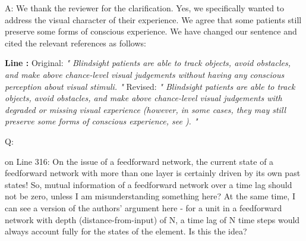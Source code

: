 \documentclass[utf8]{article}
\newcounter{cQuestion}[section]
\newenvironment{question}
    {\refstepcounter{cQuestion}\color{Blue}\noindent\newline Q\thecQuestion:}
    {~\newline}
\newenvironment{ans}  
    {\color{Black}\noindent A:}
    {~\newline}
\newcommand{\revise}[3]{
	\newline
	\newline
    \noindent
    \textbf{Line #1:}
    \newline
    Original:\newline
    \textit{"#2"}
    \newline
    \newline
    Revised:\newline
    \textit{"#3"}\newline}
\begin{document}
    
   		\begin{ans}
   			We thank the reviewer for the clarification. 
   			Yes, we specifically wanted to address the visual character of their experience. We agree that some patients still preserve some forms of conscious experience. 
   			We have changed our sentence and cited the relevant references as follows:
   			\revise{}
   			{
   				Blindsight patients are able to track objects, avoid obstacles, and make above chance-level visual judgements without having any conscious perception about visual stimuli.
   			}
   			{
   				Blindsight patients are able to track objects, avoid obstacles, and make above chance-level visual judgements with degraded or missing visual experience (however, in some cases, they may still preserve some forms of conscious experience, see \cite{overgaard2011visual, mazzi2016blind}). 
   			}
   		\end{ans}
    
    
    
    
    	\begin{question}
    	
            on Line 316: On the issue of a feedforward network, the current state of a feedforward network with more than one layer is certainly driven by its own past states! So, mutual information of a feedforward network over a time lag should not be zero, unless I am misunderstanding something here?
			At the same time, I can see a version of the authors' argument here - for a unit in a feedforward network with depth (distance-from-input) of N, a time lag of N time steps would always account fully for the states of the element. Is this the idea?		
    	\end{question}
    
\end{document}
